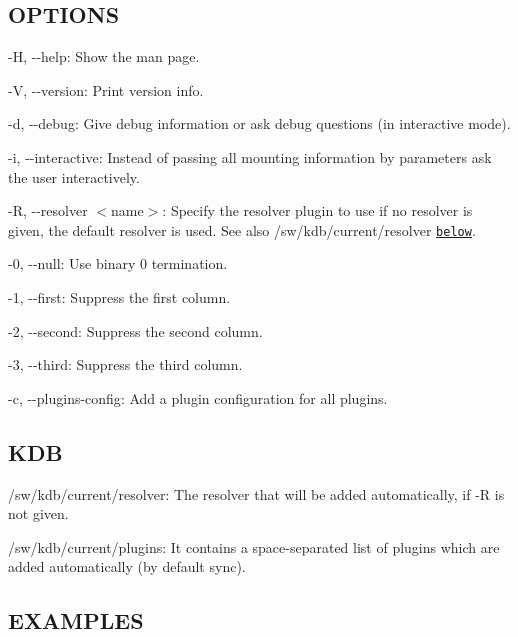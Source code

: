 \subsection*{O\+P\+T\+I\+O\+N\+S}


\begin{DoxyItemize}
\item {\ttfamily -\/\+H}, {\ttfamily -\/-\/help}\+: Show the man page.
\item {\ttfamily -\/\+V}, {\ttfamily -\/-\/version}\+: Print version info.
\item {\ttfamily -\/d}, {\ttfamily -\/-\/debug}\+: Give debug information or ask debug questions (in interactive mode).
\item {\ttfamily -\/i}, {\ttfamily -\/-\/interactive}\+: Instead of passing all mounting information by parameters ask the user interactively.
\item {\ttfamily -\/\+R}, {\ttfamily -\/-\/resolver $<$name$>$}\+: Specify the resolver plugin to use if no resolver is given, the default resolver is used. See also {\ttfamily /sw/kdb/current/resolver} \href{#KDB}{\tt below}.
\item {\ttfamily -\/0}, {\ttfamily -\/-\/null}\+: Use binary 0 termination.
\item {\ttfamily -\/1}, {\ttfamily -\/-\/first}\+: Suppress the first column.
\item {\ttfamily -\/2}, {\ttfamily -\/-\/second}\+: Suppress the second column.
\item {\ttfamily -\/3}, {\ttfamily -\/-\/third}\+: Suppress the third column.
\item {\ttfamily -\/c}, {\ttfamily -\/-\/plugins-\/config}\+: Add a plugin configuration for all plugins.
\end{DoxyItemize}

\subsection*{K\+D\+B}


\begin{DoxyItemize}
\item {\ttfamily /sw/kdb/current/resolver}\+: The resolver that will be added automatically, if {\ttfamily -\/\+R} is not given.
\item {\ttfamily /sw/kdb/current/plugins}\+: It contains a space-\/separated list of plugins which are added automatically (by default sync).
\end{DoxyItemize}

\subsection*{E\+X\+A\+M\+P\+L\+E\+S}

